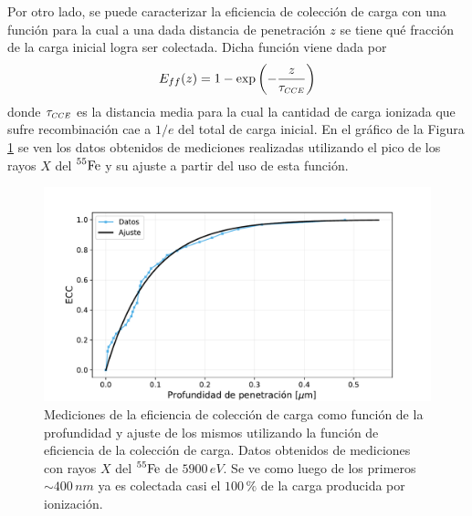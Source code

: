 Por otro lado, se puede caracterizar la eficiencia de colección de carga con una función para la cual a una dada distancia de penetración $z$ se tiene qué fracción de la carga inicial logra ser colectada. Dicha función viene dada por
\begin{equation}
    E_{ff}(z) = 1 - 
    \exp
    \left(
        -\frac{z}{\tau_{\scaleto{CCE}{4pt}}}
    \right)
        \label{ec:funcionCCE}
\end{equation}
donde $\tau_{\scaleto{CCE}{4pt}}$ es la distancia media para la cual la cantidad de carga ionizada que sufre recombinación cae a $1/e$ del total de carga inicial. En el gráfico de la Figura \ref{fig:EficienciaCC} se ven los datos obtenidos de mediciones realizadas utilizando el pico de los rayos $X$ del $\prescript{55}{}{\mbox{Fe}}$ y su ajuste a partir del uso de esta función.
\begin{figure}[h]
    \centering
        \includegraphics[scale=0.5]{Figs/CCE_vs_z.pdf}
    \caption{Mediciones de la eficiencia de colección de carga como función de la profundidad y ajuste de los mismos utilizando la función de eficiencia de la colección de carga. Datos obtenidos de mediciones con rayos $X$ del $\prescript{55}{}{\mbox{Fe}}$ de $5900\,\si{eV}$. Se ve como luego de los primeros $\sim 400\,\si{nm}$ ya es colectada casi el $100\,\%$ de la carga producida por ionización.}
    \label{fig:EficienciaCC}
\end{figure}

